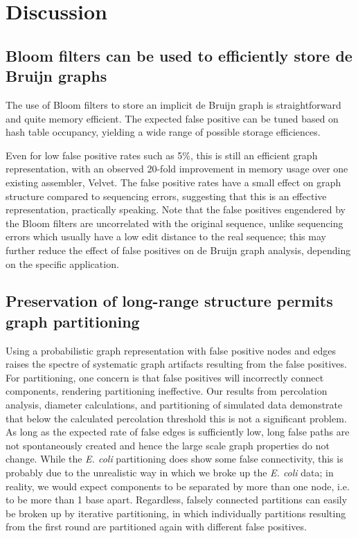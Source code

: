 \documentclass[12pt]{article} \usepackage{simplemargins}
\begin{document}
\section{Discussion}

\subsection{Bloom filters can be used to efficiently store de Bruijn graphs}

The use of Bloom filters to store an implicit de Bruijn graph is
straightforward and quite memory efficient.  The expected false
positive can be tuned based on hash table occupancy, yielding a wide
range of possible storage efficiences.

Even for low false positive rates such as 5\%, this is still an 
efficient graph representation, with an observed 20-fold improvement
in memory usage over one existing assembler, Velvet.  The false
positive rates have a small effect on graph structure compared to
sequencing errors, suggesting that this is an effective representation,
practically speaking.  Note that the false positives engendered by the
Bloom filters are uncorrelated with the original sequence, unlike
sequencing errors which usually have a low edit distance to the
real sequence; this may further reduce the effect of false positives
on de Bruijn graph analysis, depending on the specific application.

\subsection{Preservation of long-range structure permits graph partitioning}

Using a probabilistic graph representation with false positive nodes
and edges raises the spectre of systematic graph artifacts resulting
from the false positives.  For partitioning, one concern is that false
positives will incorrectly connect components, rendering partitioning
ineffective.  Our results from percolation analysis, diameter
calculations, and partitioning of simulated data demonstrate that
below the calculated percolation threshold this is not a significant
problem.  As long as the expected rate of false edges is sufficiently
low, long false paths are not spontaneously created and hence the
large scale graph properties do not change.  While the \emph{E. coli}
partitioning does show some false connectivity, this is probably due
to the unrealistic way in which we broke up the \emph{E. coli} data;
in reality, we would expect components to be separated by more than
one node, i.e. to be more than 1 base apart.  Regardless, falsely
connected partitions can easily be broken up by iterative
partitioning, in which individually partitions resulting from the first round are
partitioned again with different false positives.
\end{document}
